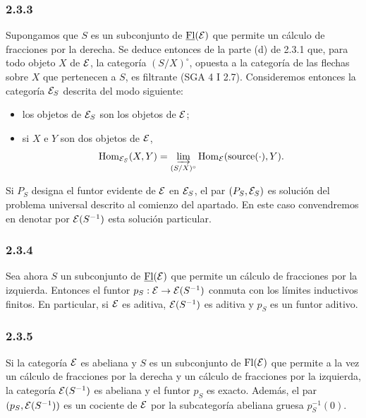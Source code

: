 \subsubsection*{2.3.3}
Supongamos que $S$ es un subconjunto de $\underline{\operatorname{Fl}}(\mathcal E)$ que permite un cálculo de fracciones por la derecha. Se deduce entonces de la parte (d) de 2.3.1 que, para todo objeto $X$ de $\mathcal E$, la categoría $(S/X)^\circ$, opuesta a la categoría de las flechas sobre $X$ que pertenecen a $S$, es filtrante (SGA 4 I 2.7). Consideremos entonces la categoría $\mathcal E_S$ descrita del modo siguiente:
\begin{itemize}
\item los objetos de $\mathcal E_S$ son los objetos de $\mathcal E$;
\item si $X$ e $Y$ son dos objetos de $\mathcal E$,
\[
\operatorname{Hom}_{\mathcal E_S}(X,Y)=\varinjlim_{(S/X)^\circ}\operatorname{Hom}_{\mathcal E}(\operatorname{source}(\cdot),Y).
\]
\end{itemize}
Si $P_S$ designa el funtor evidente de $\mathcal E$ en $\mathcal E_S$, el par $(P_S,\mathcal E_S)$ es solución del problema universal descrito al comienzo del apartado. En este caso convendremos en denotar por $\mathcal E(S^{-1})$ esta solución particular.

\subsubsection*{2.3.4}
Sea ahora $S$ un subconjunto de $\underline{\operatorname{Fl}}(\mathcal E)$ que permite un cálculo de fracciones por la izquierda. Entonces el funtor $p_S:\mathcal E\to\mathcal E(S^{-1})$ conmuta con los límites inductivos finitos. En particular, si $\mathcal E$ es aditiva, $\mathcal E(S^{-1})$ es aditiva y $p_S$ es un funtor aditivo.

\subsubsection*{2.3.5}
Si la categoría $\mathcal E$ es abeliana y $S$ es un subconjunto de $\operatorname{Fl}(\mathcal E)$ que permite a la vez un cálculo de fracciones por la derecha y un cálculo de fracciones por la izquierda, la categoría $\mathcal E(S^{-1})$ es abeliana y el funtor $p_S$ es exacto. Además, el par $(p_S,\mathcal E(S^{-1}))$ es un cociente de $\mathcal E$ por la subcategoría abeliana gruesa $p_S^{-1}(0)$.
